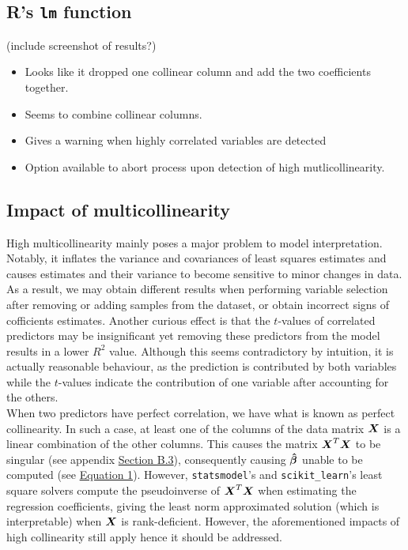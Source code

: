 \documentclass[12pt]{article}
\newcommand{\gbh}{\hat{\gb}}
\begin{document}
	\subsection{R's \texttt{lm} function}
	(include screenshot of results?)
	
	\begin{itemize}
		\item Looks like it dropped one collinear column and add the two coefficients together.
		\item Seems to combine collinear columns.
		\item Gives a warning when highly correlated variables are detected
		\item Option available to abort process upon detection of high mutlicollinearity.
	\end{itemize}
	
	\subsection{Impact of multicollinearity}
	
	High multicollinearity mainly poses a major problem to model interpretation. Notably, it inflates the variance and covariances of least squares estimates and causes estimates and their variance to become sensitive to minor changes in data. As a result, we may obtain different results when performing variable selection after removing or adding samples from the dataset, or obtain incorrect signs of cofficients estimates. Another curious effect is that the $t$-values of correlated predictors may be insignificant yet removing these predictors from the model results in a lower $R^2$ value. Although this seems contradictory by intuition, it is actually reasonable behaviour, as the prediction is contributed by both variables while the $t$-values indicate the contribution of one variable after accounting for the others.\\
	
	When two predictors have perfect correlation, we have what is known as perfect collinearity. In such a case, at least one of the columns of the data matrix $\boldsymbol{X}$ is a linear combination of the other columns. This causes the matrix $\boldsymbol{X}^T\boldsymbol{X}$ to be singular (see appendix \hyperref[sec:append1]{Section B.3}), consequently causing $\boldsymbol{\gbh}$ unable to be computed (see \hyperref[eq1]{Equation 1}). However, \texttt{statsmodel}'s and \texttt{scikit\_learn}'s least square solvers compute the pseudoinverse of $\boldsymbol{X}^T\boldsymbol{X}$ when estimating the regression coefficients, giving the least norm approximated solution (which is interpretable) when $\boldsymbol{X}$ is rank-deficient. However, the aforementioned impacts of high collinearity still apply hence it should be addressed.\\
	
\end{document}
